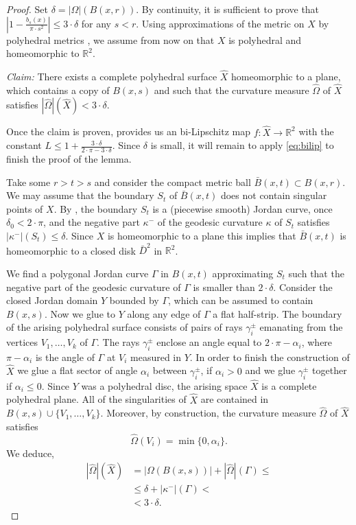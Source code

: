 \documentclass[12pt,leqno,intlimits]{amsart}
\numberwithin{equation}{section}
\theoremstyle{definition}
\theoremstyle{remark}
\newcommand{\R}{\mathbb{R}}
\def\:{\colon}
\begin{document}
\begin{proof}
{\color{red}
Set $\delta = |\Omega |( B (x,{r}))$. By continuity, it is sufficient to prove that $|1- \frac {b_s(x)} {\pi{\cdot}s^2}| \leq 3{\cdot}\delta $ for any $s<r$. Using approximations of
the metric on $X$ by polyhedral metrics \cite[Theorem 8.4.3, Theorem 8.1.9]{Reshetnyak-GeomIV}, we assume from now on that $X$ is polyhedral and homeomorphic to $\R^2$.

\emph{Claim:} There exists a complete polyhedral surface $\hat X$ homeomorphic to a plane, which contains a copy of $B (x,s)$ and such that
the curvature measure $\hat \Omega$ of $\hat X$ satisfies $|\hat \Omega | (\hat X) < 3 \cdot \delta$.

Once the claim is proven,
\cite{Bonk-Lang} provides us an bi-Lipschitz map $f\:\hat X\to \R^2$ with the constant $L\leq 1+\frac {3{\cdot}\delta} {2{\cdot}\pi -3{\cdot}\delta}$.
Since $\delta$ is small, it will remain to apply \eqref{eq:bilip} to finish the proof of the lemma.



Take some $r>t>s$ and consider the compact metric ball $\bar B (x,t) \subset B (x,r)$.
We may assume that the boundary $S_t$ of
$\bar B (x,t)$ does not contain singular points of $X$.
By \cite[Theorem 9.1, Theorem 9.3] {Reshetnyak-GeomIV}, the boundary $S_t$ is a (piecewise smooth) Jordan curve, once $\delta _0< 2{\cdot}\pi$, and the negative part $\kappa ^-$ of the geodesic curvature $\kappa$ of $S_t$ satisfies $|\kappa ^-| (S_t) \leq \delta$.
Since $X$ is homeomorphic to a plane this implies that $\bar B (x,t)$ is homeomorphic to a closed disk $\bar D^2$ in $\R^2$.

}

We find a polygonal Jordan curve $\Gamma$ in $B(x,t)$ approximating $S_t$ such that the negative part of the geodesic curvature of $\Gamma$ is smaller than $2{\cdot}\delta$. Consider the closed Jordan domain $Y$ bounded by $\Gamma$, which can be assumed to contain $B(x,s)$.
Now we glue to $Y$ along any edge of $\Gamma$ a flat half-strip.
The boundary of the arising polyhedral surface consists of pairs of rays
$\gamma _i ^{\pm}$ emanating from the vertices $V_1,\dots,V_k$ of $\Gamma$. The rays $\gamma _i^{\pm}$ enclose an angle equal to $2{\cdot}\pi- \alpha _i$, where $\pi-\alpha _i$ is the angle of $\Gamma$ at $V_i$ measured in $Y$. In order to finish the construction of $\hat X$ we glue a flat sector of
angle $\alpha _i$ between $\gamma _i ^{\pm}$, if $\alpha _i >0$ and we glue $\gamma _i^{\pm}$ together if $\alpha _i \leq 0$.
Since $Y$ was a polyhedral disc, the arising space $\hat X$ is a complete polyhedral plane.
All of the singularities of $\hat X$ are contained in $B(x,s) \cup \{ V_1,\dots, V_k\}$. Moreover, by construction, the curvature measure
$\hat \Omega$ of $\hat X$ satisfies
$$\hat \Omega (V_i) = \min \{ 0, \alpha _i \}.$$
We deduce,
\begin{align*}
|\hat \Omega | ( \hat X) &= |\Omega (B (x,s))| + |\hat \Omega | ( \Gamma ) \leq
\\
&\leq \delta + |\kappa ^-| (\Gamma ) <
\\
&< 3{\cdot}\delta.
\end{align*}



\end{proof}
\end{document}
